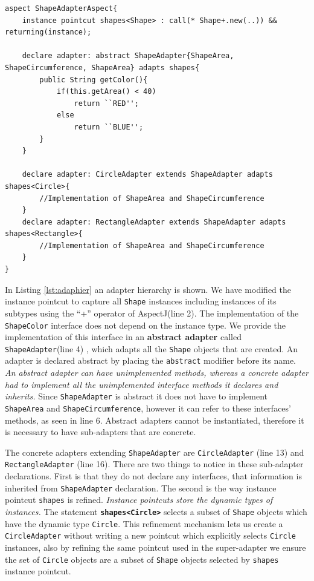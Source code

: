 \documentclass{llncs}
\begin{document}
\begin{lstlisting}[float=tb, caption={An Adapter Hierarchy}, label={lst:adaphier}]
aspect ShapeAdapterAspect{
	instance pointcut shapes<Shape> : call(* Shape+.new(..)) && returning(instance);
	
	declare adapter: abstract ShapeAdapter{ShapeArea, ShapeCircumference, ShapeArea} adapts shapes{
		public String getColor(){
			if(this.getArea() < 40)
				return ``RED'';
			else
				return ``BLUE'';
		}
	}

	declare adapter: CircleAdapter extends ShapeAdapter adapts shapes<Circle>{
		//Implementation of ShapeArea and ShapeCircumference
	}
	declare adapter: RectangleAdapter extends ShapeAdapter adapts shapes<Rectangle>{
		//Implementation of ShapeArea and ShapeCircumference
	}
}
\end{lstlisting}

In Listing \ref{lst:adaphier} an adapter hierarchy is shown. We have modified the instance pointcut to capture all \texttt{Shape} instances including instances of its subtypes using the ``+'' operator of AspectJ(line 2). The implementation of the \texttt{ShapeColor} interface does not depend on the instance type. We provide the implementation of this interface in an \textbf{abstract adapter} called \texttt{ShapeAdapter}(line 4) , which adapts all the \texttt{Shape} objects that are created. An adapter is declared abstract by placing the \texttt{abstract} modifier before its name. \emph{An abstract adapter can have unimplemented methods, whereas a concrete adapter had to implement all the unimplemented interface methods it declares and inherits.} Since \texttt{ShapeAdapter} is abstract it does not have to implement \texttt{ShapeArea} and \texttt{ShapeCircumference}, however it can refer to these interfaces' methods, as seen in line 6.  Abstract adapters cannot be instantiated, therefore it is necessary to have sub-adapters that are concrete.

The concrete adapters extending \texttt{ShapeAdapter} are \texttt{CircleAdapter} (line 13) and \texttt{RectangleAdapter} (line 16). There are two things to notice in these sub-adapter declarations. First is that they do not declare any interfaces, that information is inherited from \texttt{ShapeAdapter} declaration. The second is the way instance pointcut \texttt{shapes} is refined. \emph{Instance pointcuts store the dynamic types of instances.} The statement \texttt{\textbf{shapes<Circle>}} selects a subset of \texttt{Shape} objects which have the dynamic type \texttt{Circle}. This refinement mechanism lets us create a \texttt{CircleAdapter} without writing a new pointcut which explicitly selects \texttt{Circle} instances, also by refining the same pointcut used in the super-adapter we ensure the set of \texttt{Circle} objects are a subset of \texttt{Shape} objects selected by \texttt{shapes} instance pointcut.
\end{document}
